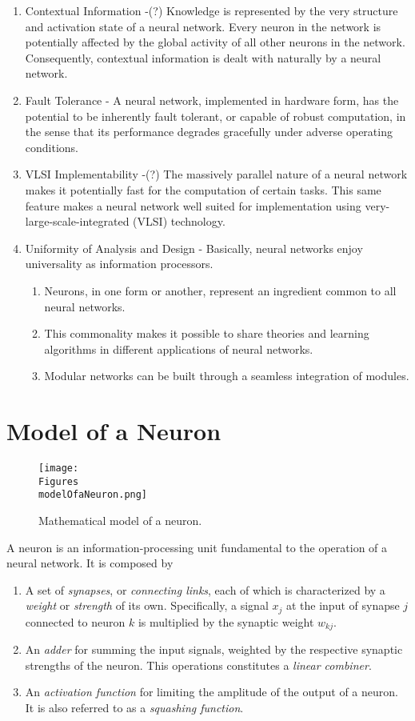 \documentclass[twocolumn]{article}
\begin{document}
\begin{enumerate}
		 \item Contextual Information -(?) Knowledge is represented by the very structure and activation state of a neural network. Every neuron in the network is potentially affected by the global activity of all other neurons in the network. Consequently, contextual information is dealt with naturally by a neural network.
		 \item Fault Tolerance - A neural network, implemented in hardware form, has the potential to be inherently fault tolerant, or capable of robust computation, in the sense that its performance degrades gracefully under adverse operating conditions.
		 \item VLSI Implementability -(?) The massively parallel nature of a neural network makes it potentially fast for the computation of certain tasks. This same feature makes a neural network well suited for implementation using very-large-scale-integrated (VLSI) technology.
		 \item Uniformity of Analysis and Design - Basically, neural networks enjoy universality as information processors.
		       \begin{enumerate}
			       \item Neurons, in one form or another, represent an ingredient common to all neural networks.
			       \item This commonality makes it possible to share theories and learning algorithms in different applications of neural networks.
			       \item Modular networks can be built through a seamless integration of modules.
		       \end{enumerate}
	 \end{enumerate}

\section{Model of a Neuron}

 \begin{figure}[H]
	 \center
	 \texttt{[image: \\Figures\\modelOfaNeuron.png]}
	 \caption{Mathematical model of a neuron.}
	 \label{modelofaneuron}
 \end{figure}

 A neuron is an information-processing unit fundamental to the operation of a neural network. It is composed by

 \begin{enumerate}
	 \item A set of \textit{synapses}, or \textit{connecting links}, each of which is characterized by a \textit{weight} or \textit{strength} of its own. Specifically, a signal $ x_j $ at the input of synapse $ j $ connected to neuron $ k $ is multiplied by the synaptic weight $ w_{kj} $.
	 \item An \textit{adder} for summing the input signals, weighted by the respective synaptic strengths of the neuron. This operations constitutes a \textit{linear combiner}.
	 \item An \textit{activation function} for limiting the amplitude of the output of a neuron. It is also referred to as a \textit{squashing function}.
 \end{enumerate}
\end{document}
